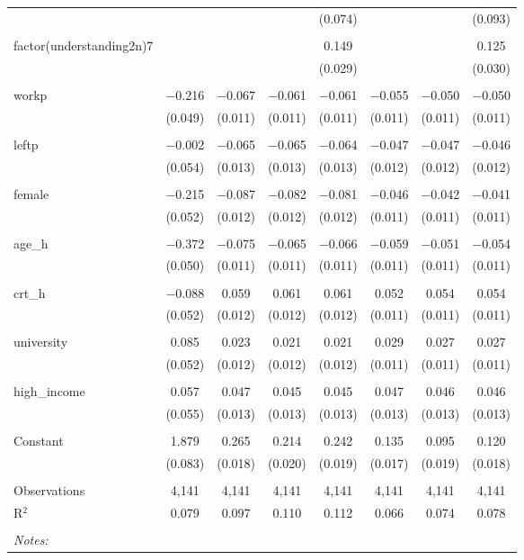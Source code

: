 \begin{table}[!htbp]
\begin{tabular}{@{\extracolsep{5pt}}lccccccc}
  &  &  &  & (0.074) &  &  & (0.093) \\ 
  & & & & & & & \\ 
 factor(understanding2n)7 &  &  &  & 0.149 &  &  & 0.125 \\ 
  &  &  &  & (0.029) &  &  & (0.030) \\ 
  & & & & & & & \\ 
 workp & $-$0.216 & $-$0.067 & $-$0.061 & $-$0.061 & $-$0.055 & $-$0.050 & $-$0.050 \\ 
  & (0.049) & (0.011) & (0.011) & (0.011) & (0.011) & (0.011) & (0.011) \\ 
  & & & & & & & \\ 
 leftp & $-$0.002 & $-$0.065 & $-$0.065 & $-$0.064 & $-$0.047 & $-$0.047 & $-$0.046 \\ 
  & (0.054) & (0.013) & (0.013) & (0.013) & (0.012) & (0.012) & (0.012) \\ 
  & & & & & & & \\ 
 female & $-$0.215 & $-$0.087 & $-$0.082 & $-$0.081 & $-$0.046 & $-$0.042 & $-$0.041 \\ 
  & (0.052) & (0.012) & (0.012) & (0.012) & (0.011) & (0.011) & (0.011) \\ 
  & & & & & & & \\ 
 age\_h & $-$0.372 & $-$0.075 & $-$0.065 & $-$0.066 & $-$0.059 & $-$0.051 & $-$0.054 \\ 
  & (0.050) & (0.011) & (0.011) & (0.011) & (0.011) & (0.011) & (0.011) \\ 
  & & & & & & & \\ 
 crt\_h & $-$0.088 & 0.059 & 0.061 & 0.061 & 0.052 & 0.054 & 0.054 \\ 
  & (0.052) & (0.012) & (0.012) & (0.012) & (0.011) & (0.011) & (0.011) \\ 
  & & & & & & & \\ 
 university & 0.085 & 0.023 & 0.021 & 0.021 & 0.029 & 0.027 & 0.027 \\ 
  & (0.052) & (0.012) & (0.012) & (0.012) & (0.011) & (0.011) & (0.011) \\ 
  & & & & & & & \\ 
 high\_income & 0.057 & 0.047 & 0.045 & 0.045 & 0.047 & 0.046 & 0.046 \\ 
  & (0.055) & (0.013) & (0.013) & (0.013) & (0.013) & (0.013) & (0.013) \\ 
  & & & & & & & \\ 
 Constant & 1.879 & 0.265 & 0.214 & 0.242 & 0.135 & 0.095 & 0.120 \\ 
  & (0.083) & (0.018) & (0.020) & (0.019) & (0.017) & (0.019) & (0.018) \\ 
  & & & & & & & \\ 
Observations & 4,141 & 4,141 & 4,141 & 4,141 & 4,141 & 4,141 & 4,141 \\ 
R$^{2}$ & 0.079 & 0.097 & 0.110 & 0.112 & 0.066 & 0.074 & 0.078 \\ 
\hline \\[-1.8ex] 
\textit{Notes:} & \multicolumn{7}{l}{} \\ 
\end{tabular} 
\end{table} 
